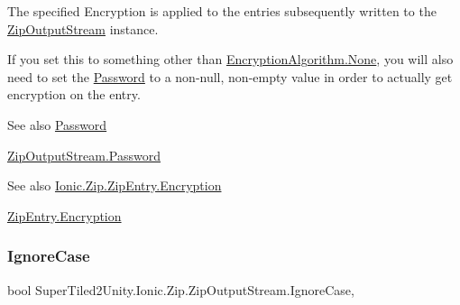 The specified Encryption is applied to the entries subsequently written to the {\ttfamily \mbox{\hyperlink{class_super_tiled2_unity_1_1_ionic_1_1_zip_1_1_zip_output_stream}{Zip\+Output\+Stream}}} instance. 

If you set this to something other than \mbox{\hyperlink{namespace_super_tiled2_unity_1_1_ionic_1_1_zip_aa3f4e8aa12ef827ac72177a49b4e28e6a6adf97f83acf6453d4a6a4b1070f3754}{Encryption\+Algorithm.\+None}}, you will also need to set the \mbox{\hyperlink{class_super_tiled2_unity_1_1_ionic_1_1_zip_1_1_zip_output_stream_a574733e2d7d17252b7d89f966d588eb9}{Password}} to a non-\/null, non-\/empty value in order to actually get encryption on the entry. 

\begin{DoxySeeAlso}{See also}
\mbox{\hyperlink{class_super_tiled2_unity_1_1_ionic_1_1_zip_1_1_zip_output_stream_a574733e2d7d17252b7d89f966d588eb9}{Password}}


\end{DoxySeeAlso}
\mbox{\hyperlink{class_super_tiled2_unity_1_1_ionic_1_1_zip_1_1_zip_output_stream_a574733e2d7d17252b7d89f966d588eb9}{Zip\+Output\+Stream.\+Password}}

\begin{DoxySeeAlso}{See also}
\mbox{\hyperlink{class_super_tiled2_unity_1_1_ionic_1_1_zip_1_1_zip_entry_ab8de4882ffe896d2657b27264807ef1c}{Ionic.\+Zip.\+Zip\+Entry.\+Encryption}}


\end{DoxySeeAlso}
\mbox{\hyperlink{class_super_tiled2_unity_1_1_ionic_1_1_zip_1_1_zip_entry_ab8de4882ffe896d2657b27264807ef1c}{Zip\+Entry.\+Encryption}}\mbox{\label{class_super_tiled2_unity_1_1_ionic_1_1_zip_1_1_zip_output_stream_ad9c1b5d8e5d348c31ca8126649dd245c}} 
\subsubsection{\texorpdfstring{Ignore\+Case}{IgnoreCase}}
{\footnotesize\ttfamily bool Super\+Tiled2\+Unity.\+Ionic.\+Zip.\+Zip\+Output\+Stream.\+Ignore\+Case\hspace{0.3cm}{\ttfamily [get]}, {\ttfamily [set]}}



